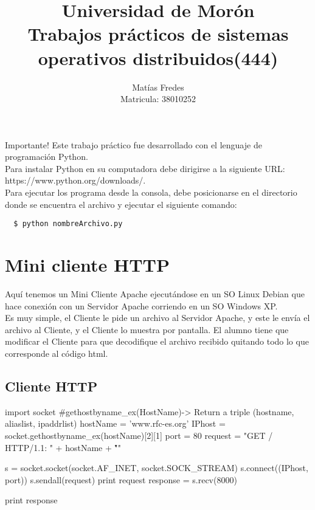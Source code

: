 \documentclass[12pt,a4paper,titlepage]{article}
\title{Universidad de Mor\'on\\ Trabajos pr\'acticos de sistemas operativos distribuidos(444)}
\author{Mat\'ias Fredes \\Matricula: 38010252}
\begin{document}
    \maketitle
    \newpage
    \begin{bclogo}[logo=\bcattention, couleurBarre=red, noborder=true, 
               couleur=LightSalmon]{Importante!}
    Este trabajo pr\'actico fue desarrollado con el lenguaje de programaci\'on Python.\\
    Para instalar Python en su computadora debe dirigirse a la siguiente URL: https://www.python.org/downloads/.\\
    Para ejecutar los programa desde la consola, debe posicionarse en el directorio donde se encuentra el archivo y ejecutar el siguiente comando:\begin{verbatim}
  $ python nombreArchivo.py
    \end{verbatim}
    \end{bclogo}
    
    \section{Mini cliente HTTP}
    
  \noindent Aquí tenemos un Mini Cliente Apache ejecutándose en un SO Linux Debian que hace
conexi\'on con un Servidor Apache corriendo en un SO Windows XP.\\
Es muy simple, el Cliente le pide un archivo al Servidor Apache, y este le envía el
archivo al Cliente, y el Cliente lo muestra por pantalla.
El alumno tiene que modificar el Cliente para que decodifique el archivo recibido
quitando todo lo que corresponde al código html.
     
   
    \subsection{Cliente HTTP}
    \begin{python}
import socket
#gethostbyname_ex(HostName)-> Return a triple (hostname, aliaslist, ipaddrlist)
hostName = 'www.rfc-es.org'
IPhost = socket.gethostbyname_ex(hostName)[2][1]
port = 80
request = "GET / HTTP/1.1\nHost: " + hostName + "\r\n\r\n"

s = socket.socket(socket.AF_INET, socket.SOCK_STREAM)
s.connect((IPhost, port))
s.sendall(request)
print request
response = s.recv(8000)

print response
    \end{python}
  
\end{document}
